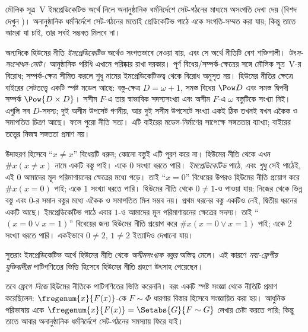 \documentclass[../../../include/open-logic-section]{subfiles}
\begin{document}
মৌলিক সূত্র~V ইমপ্রেডিকেটিভ অর্থে নিলে অনানুষ্ঠানিক ধর্মনির্দেশে
সেট-গঠনের মাধ্যমে অসংগতি দেখা দেয়
(বিশদ দেখুন )। অনানুষ্ঠানিক ধর্মনির্দেশে সেট-গঠনের
মতোই প্রেডিকেটিভ পাঠে একে সংগতি-সম্মত করা যায়;
কিন্তু তাতে আমরা যা চাই, তার সবই সম্ভবত মিলবে না।

অন্যদিকে হিউমের নীতি \emph{ইমপ্রেডিকেটিভ} অর্থেও
সংগতভাবে নেওয়া যায়, এবং সে অর্থে নীতিটি
বেশ শক্তিশালী।
\emph{উৎস-সংশোধন-নোট।} আনুষ্ঠানিক পরিধি এখানে
পরিষ্কার রাখা দরকার। পূর্ণ বিধেয়/সম্পর্ক-ক্ষেত্রের সঙ্গে
মৌলিক সূত্র~V-র বিরোধ; সম্পর্ক-ক্ষেত্র সীমিত করলে
শুধু নামের ইমপ্রেডিকেটিভত্ব থেকে বিরোধ অনুসৃত নয়।
হিউমের নীতির ক্ষেত্রে বাইরের সেটতত্ত্বে একটি স্পষ্ট মডেল
আছে: বস্তু-ক্ষেত্র $D=\omega+1$, সমস্ত বিধেয়
$\Pow D$ এবং সমস্ত দ্বিপদী সম্পর্ক $\Pow{D\times D}$।
সসীম $F$-এ তার স্বাভাবিক সদস্যসংখ্যা এবং অসীম $F$-এ
$\omega$ বস্তুটিকে সংখ্যা নিই। এগুলি সব $D$-সদস্য;
দুই অসীম উপসেট গণনীয়, আর দুই সসীম উপসেটে সংখ্যা
একই ঠিক তখনই যখন একৈক ও সমাপতিত চিত্রণ আছে। ফলে পুরো নীতি
সত্য। এটি বাইরের মডেল-নির্মাণের সাপেক্ষে সঙ্গততার
ব্যাখ্যা; বাইরের তত্ত্বের নিজস্ব সঙ্গততা প্রমাণ নয়।

উদাহরণ হিসেবে ``$x\neq x$'' বিধেয়টি ধরুন;
কোনো বস্তুই এটি পূরণ করে না। হিউমের নীতি থেকে
এখন $\#x(x\neq x)$ নামে একটি বস্তু পাই। একে
$0$ সংখ্যা ধরতে পারি। \emph{ইমপ্রেডিকেটিভ} পাঠে,
এবং \emph{শুধু} সেই পাঠেই, এই $0$ আমাদের মূল
পরিমাণায়নের ক্ষেত্রের মধ্যে পড়ে। তাই
``$x=0$'' বিধেয়ের উপরও হিউমের নীতি প্রয়োগ করে
$\#x(x=0)$ পাই; একে $1$ সংখ্যা ধরতে পারি।
হিউমের নীতি থেকে $0\neq 1$-ও পাওয়া যায়:
নিজের থেকে ভিন্ন বস্তু এবং $0$-র সমান বস্তুর মধ্যে
একৈক ও সমাপতিত মিল সম্ভব নয়। প্রথম ধরনের
বস্তু একটিও নেই, দ্বিতীয় ধরনের একটি আছে।
ইমপ্রেডিকেটিভ পাঠে এবার $1$-ও আমাদের মূল
পরিমাণায়নের ক্ষেত্রের সদস্য। তাই
``$(x=0\lor x=1)$'' বিধেয়ের জন্য হিউমের নীতি
প্রয়োগ করে $\#x(x=0\lor x=1)$ পাই;
একে $2$ সংখ্যা ধরতে পারি। একইভাবে
$0\neq 2$, $1\neq 2$ ইত্যাদিও দেখানো যায়।

সুতরাং ইমপ্রেডিকেটিভ অর্থে হিউমের নীতি থেকে
\emph{অসীমসংখ্যক বস্তুর} অস্তিত্ব মেলে। এই কারণে
\emph{নব্য-ফ্রেগীয় যুক্তিবাদীরা} পাটিগণিতের ভিত্তি
হিসেবে হিউমের নীতি গ্রহণে উৎসাহ পেয়েছেন।

তবে ফ্রেগে \emph{নিজে} হিউমের নীতিকে পাটিগণিতের
ভিত্তি করেননি। বরং একটি স্পষ্ট সংজ্ঞা থেকে নীতিটি
প্রমাণ করেছিলেন: $\fregenum{x}{F(x)}$-কে
$F\sim\Phi$ ধারণার বিস্তার হিসেবে সংজ্ঞায়িত করা হয়।
আধুনিক পরিভাষায় একে
$\fregenum{x}{F(x)}=\Setabs{G}{F\sim G}$
লেখার চেষ্টা করতে পারি; কিন্তু তাতে আবার অনানুষ্ঠানিক ধর্মনির্দেশে
সেট-গঠনের সমস্যায় ফিরে যাই।
\end{document}
